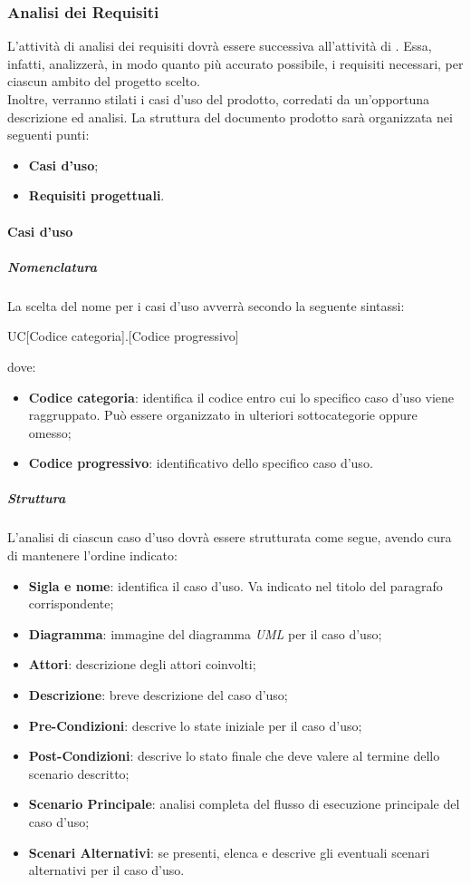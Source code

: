 		 \subsubsection{Analisi dei Requisiti}
		L'attività di analisi dei requisiti dovrà essere successiva all'attività di \SdF. Essa, infatti, analizzerà, in modo quanto più accurato possibile, i requisiti necessari, per ciascun ambito del progetto scelto.\\
		Inoltre, verranno stilati i casi d'uso del prodotto, corredati da un'opportuna descrizione ed analisi. La struttura del documento prodotto sarà organizzata nei seguenti punti:
		\begin{itemize}
			\item \textbf{Casi d'uso};
			\item \textbf{Requisiti progettuali}.
		\end{itemize}
		
		\paragraph{Casi d'uso}
		
			\subparagraph{Nomenclatura}
			La scelta del nome per i casi d'uso avverrà secondo la seguente sintassi:
			\begin{center}
				UC[Codice categoria].[Codice progressivo]
			\end{center}
			dove:
			\begin{itemize}
				\item\textbf{Codice categoria}: identifica il codice entro cui lo specifico caso d'uso viene raggruppato. Può essere organizzato in ulteriori sottocategorie oppure omesso;
				\item\textbf{Codice progressivo}: identificativo dello specifico caso d'uso.
			\end{itemize}
			
			\subparagraph{Struttura}
			L'analisi di ciascun caso d'uso dovrà essere strutturata come segue, avendo cura di mantenere l'ordine indicato:
			\begin{itemize}
				\item\textbf{Sigla e nome}: identifica il caso d'uso. Va indicato nel titolo del paragrafo corrispondente;
				\item\textbf{Diagramma}: immagine del diagramma \textit{UML} per il caso d'uso;
				\item\textbf{Attori}: descrizione degli attori coinvolti;
				\item\textbf{Descrizione}: breve descrizione del caso d'uso;
				\item\textbf{Pre-Condizioni}: descrive lo state iniziale per il caso d'uso;
				\item\textbf{Post-Condizioni}: descrive lo stato finale che deve valere al termine dello scenario descritto;
				\item\textbf{Scenario Principale}: analisi completa del flusso di esecuzione principale del caso d'uso;
				\item\textbf{Scenari Alternativi}: se presenti, elenca e descrive gli eventuali scenari alternativi per il caso d'uso.
			\end{itemize}
		
